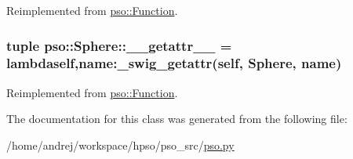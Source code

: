 Reimplemented from \hyperlink{classpso_1_1Function_5bddc07dbaab0ee579488bdcc8103a71}{pso::Function}.\hypertarget{classpso_1_1Sphere_bf0e6b7f99fe3b2202b4f73441f594c6}{
\subsubsection{\setlength{\rightskip}{0pt plus 5cm}tuple {\bf pso::Sphere::\_\-\_\-getattr\_\-\_\-} = lambdaself,name:\_\-swig\_\-getattr(self, {\bf Sphere}, name)}}
\label{classpso_1_1Sphere_bf0e6b7f99fe3b2202b4f73441f594c6}




Reimplemented from \hyperlink{classpso_1_1Function_affeed856b337656e88895fa35321496}{pso::Function}.

The documentation for this class was generated from the following file:\begin{CompactItemize}
\item 
/home/andrej/workspace/hpso/pso\_\-src/\hyperlink{pso_8py}{pso.py}\end{CompactItemize}
